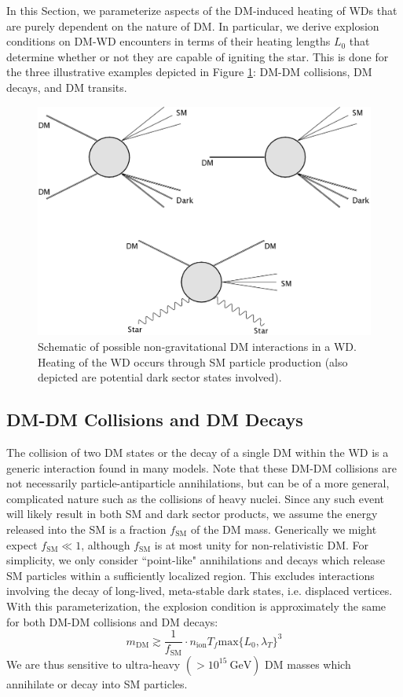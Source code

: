 \documentclass[twocolumn,showpacs,preprintnumbers,amsmath,amssymb,prd]{revtex4}
\newcommand{\GeV}{\text{GeV}}
\begin{document}
In this Section, we parameterize aspects of the DM-induced heating of WDs that are purely dependent on the nature of DM. 
In particular, we derive explosion conditions on DM-WD encounters in terms of their heating lengths $L_0$ that determine whether or not they are capable of igniting the star.
This is done for the three illustrative examples depicted in Figure \ref{fig:feynman}: DM-DM collisions, DM decays, and DM transits. 
\begin{figure}
\includegraphics[scale=0.09]{feynmandiag.jpg}
\caption{Schematic of possible non-gravitational DM interactions in a WD. Heating of the WD occurs through SM particle production (also depicted are potential dark sector states involved).}
\label{fig:feynman}
\end{figure}

\subsection{DM-DM Collisions and DM Decays}
\label{sec:DMcoldecay}

The collision of two DM states or the decay of a single DM within the WD is a generic interaction found in many models.
Note that these DM-DM collisions are not necessarily particle-antiparticle annihilations, but can be of a more general, complicated nature such as the collisions of heavy nuclei.
Since any such event will likely result in both SM and dark sector products, we assume the energy released into the SM is a fraction $f_\text{SM}$ of the DM mass.
Generically we might expect $f_\text{SM} \ll 1$, although $f_\text{SM}$ is at most unity for non-relativistic DM.
For simplicity, we only consider ``point-like" annihilations and decays which release SM particles within a sufficiently localized region. 
This excludes interactions involving the decay of long-lived, meta-stable dark states, i.e. displaced vertices. 
With this parameterization, the explosion condition is approximately the same for both DM-DM collisions and DM decays:
\begin{equation}
\label{eq:coldecay}
  m_\text{DM} \gtrsim \frac{1}{f_\text{SM}} \cdot n_\text{ion} T_f \text{max}\{L_0, \lambda_T\}^3
\end{equation}
We are thus sensitive to ultra-heavy $(> 10^{15} ~\GeV)$ DM masses which annihilate or decay into SM particles. 
\end{document}
